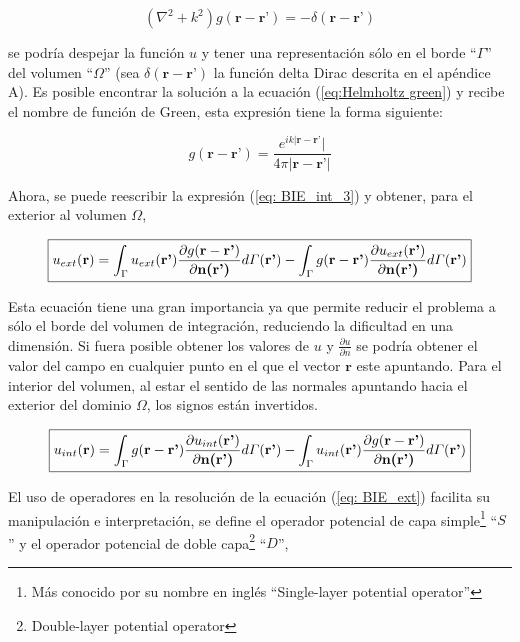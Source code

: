 \documentclass[12pt,letterpaper]{article}
\numberwithin{equation}{section}
\begin{document}
\begin{equation}
	(\nabla^2+k^2)g(\textbf{r}-\textbf{r'})=-\delta(\textbf{r}-\textbf{r'})
	\label{eq:Helmholtz green}
\end{equation}

se podría despejar la función $u$ y tener una representación sólo en el borde ``$\varGamma$'' del volumen ``$\varOmega$'' (sea $\delta(\textbf{r}-\textbf{r'})$ la función delta Dirac descrita en el apéndice A). Es posible encontrar la solución a la ecuación (\ref{eq:Helmholtz green}) y recibe el nombre de función de Green, esta expresión tiene la forma siguiente:

$$g(\textbf{r}-\textbf{r'})=\frac{e^{ik|\textbf{r}-\textbf{r'}}|}{4\pi |\textbf{r}-\textbf{r'}|}$$

Ahora, se puede reescribir la expresión (\ref{eq: BIE_int_3}) y obtener, para el exterior al volumen $\Omega$,

\begin{equation}
\boxed{
u_{ext}(\textbf{r})=\int_{\Gamma}u_{ext}(\textbf{r'})\frac{\partial g(\textbf{r}-\textbf{r'})}{\partial\textbf{n(\textbf{r'})}}d\varGamma(\textbf{r'}) - \int_{\Gamma}g(\textbf{r}-\textbf{r'})\frac{\partial u_{ext}(\textbf{r'})}{\partial\textbf{n(\textbf{r'})}}d\varGamma(\textbf{r'})
\label{eq: BIE_ext}
}	
\end{equation}

Esta ecuación tiene una gran importancia ya que permite reducir el problema a sólo el borde del volumen de integración, reduciendo la dificultad en una dimensión. Si fuera posible obtener los valores de $u$ y $\frac{\partial u}{\partial n}$ se podría obtener el valor del campo en cualquier punto en el que el vector $\textbf{r}$ este apuntando. Para el interior del volumen, al estar el sentido de las normales apuntando hacia el exterior del dominio $\Omega$, los signos están invertidos.

\begin{equation}
\boxed{
	u_{int}(\textbf{r})=\int_{\Gamma}g(\textbf{r}-\textbf{r'})\frac{\partial u_{int}(\textbf{r'})}{\partial\textbf{n(\textbf{r'})}}d\varGamma(\textbf{r'}) - \int_{\Gamma}u_{int}(\textbf{r'})\frac{\partial g(\textbf{r}-\textbf{r'})}{\partial\textbf{n(\textbf{r'})}}d\varGamma(\textbf{r'})
	\label{eq: BIE_int}
}	
\end{equation}

El uso de operadores en la resolución de la ecuación (\ref{eq: BIE_ext}) facilita su manipulación e interpretación, se define el operador potencial de capa simple\footnote{Más conocido por su nombre en inglés ``Single-layer potential operator''} ``$S$ '' y el operador potencial de doble capa\footnote{Double-layer potential operator} ``$D$'',
\end{document}
